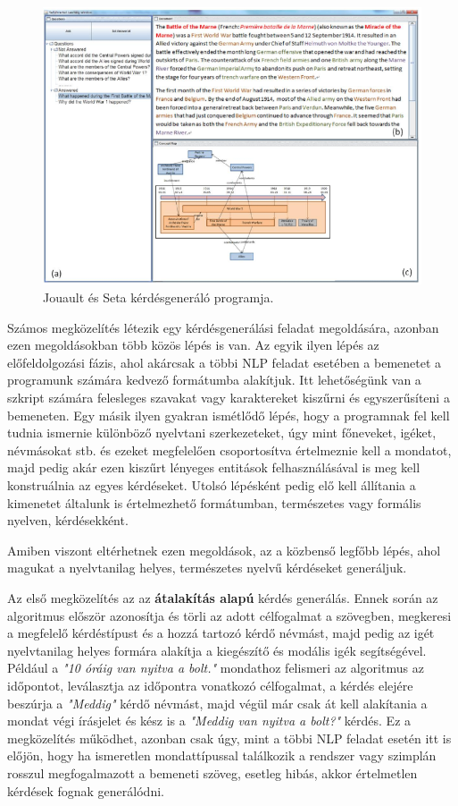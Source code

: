 \begin{figure}[h]
\centering
\includegraphics[scale=0.45]{images/wiki_qg.png}
\caption{Jouault és Seta kérdésgeneráló programja.}
\label{fig:wiki_qg}
\end{figure}


Számos megközelítés létezik egy kérdésgenerálási feladat megoldására, azonban ezen megoldásokban több közös lépés is van. Az egyik ilyen lépés az előfeldolgozási fázis, ahol akárcsak a többi NLP feladat esetében a bemenetet a programunk számára kedvező formátumba alakítjuk. Itt lehetőségünk van a szkript számára felesleges szavakat vagy karaktereket kiszűrni és egyszerűsíteni a bemeneten. Egy másik ilyen gyakran ismétlődő lépés, hogy a programnak fel kell tudnia ismernie különböző nyelvtani szerkezeteket, úgy mint főneveket, igéket, névmásokat stb. és ezeket megfelelően csoportosítva értelmeznie kell a mondatot, majd pedig akár ezen kiszűrt lényeges entitások felhasználásával is meg kell konstruálnia az egyes kérdéseket. Utolsó lépésként pedig elő kell állítania a kimenetet általunk is értelmezhető formátumban, természetes vagy formális nyelven, kérdésekként.

Amiben viszont eltérhetnek ezen megoldások, az a közbenső legfőbb lépés, ahol magukat a nyelvtanilag helyes, természetes nyelvű kérdéseket generáljuk.

Az első megközelítés az az \textbf{átalakítás alapú} kérdés generálás. Ennek során az algoritmus először azonosítja és törli az adott célfogalmat a szövegben, megkeresi a megfelelő kérdéstípust és a hozzá tartozó kérdő névmást, majd pedig az igét nyelvtanilag helyes formára alakítja a kiegészítő és modális igék segítségével. Például a \textit{"10 óráig van nyitva a bolt."} mondathoz felismeri az algoritmus az időpontot, leválasztja az időpontra vonatkozó célfogalmat, a kérdés elejére beszúrja a \textit{"Meddig"} kérdő névmást, majd végül már csak át kell alakítania a mondat végi írásjelet és kész is a \textit{"Meddig van nyitva a bolt?"} kérdés. Ez a megközelítés működhet, azonban csak úgy, mint a többi NLP feladat esetén itt is előjön, hogy ha ismeretlen mondattípussal találkozik a rendszer vagy szimplán rosszul megfogalmazott a bemeneti szöveg, esetleg hibás, akkor értelmetlen kérdések fognak generálódni.

